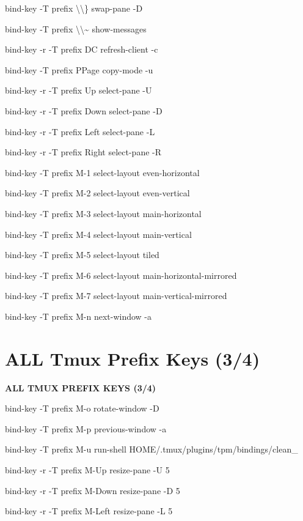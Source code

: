 \documentclass[11pt,a4paper,twoside]{book}
\begin{document}
bind-key  -T prefix  \textbackslash{}\textbackslash{}\}  swap-pane -D

bind-key  -T prefix  \textbackslash{}\textbackslash{}\textasciitilde{}  show-messages

bind-key -r -T prefix  DC  refresh-client -c

bind-key  -T prefix  PPage  copy-mode -u

bind-key -r -T prefix  Up  select-pane -U

bind-key -r -T prefix  Down  select-pane -D

bind-key -r -T prefix  Left  select-pane -L

bind-key -r -T prefix  Right  select-pane -R

bind-key  -T prefix  M-1  select-layout even-horizontal

bind-key  -T prefix  M-2  select-layout even-vertical

bind-key  -T prefix  M-3  select-layout main-horizontal

bind-key  -T prefix  M-4  select-layout main-vertical

bind-key  -T prefix  M-5  select-layout tiled

bind-key  -T prefix  M-6  select-layout main-horizontal-mirrored

bind-key  -T prefix  M-7  select-layout main-vertical-mirrored

bind-key  -T prefix  M-n  next-window -a


\vspace{16pt}

\section{ALL Tmux Prefix Keys (3/4)}


\vspace{10pt}
{\large\bfseries\color{neoncyan} ALL TMUX PREFIX KEYS (3/4)}\vspace{6pt}

bind-key  -T prefix  M-o  rotate-window -D

bind-key  -T prefix  M-p  previous-window -a

bind-key  -T prefix  M-u  run-shell HOME/.tmux/plugins/tpm/bindings/clean\_

bind-key -r -T prefix  M-Up  resize-pane -U 5

bind-key -r -T prefix  M-Down  resize-pane -D 5

bind-key -r -T prefix  M-Left  resize-pane -L 5
\end{document}

